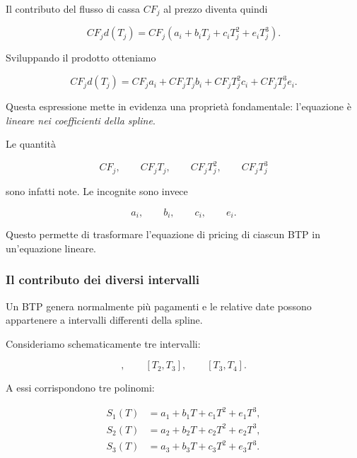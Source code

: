 Il contributo del flusso di cassa $CF_j$ al prezzo diventa quindi

\begin{equation*}
    CF_jd(T_j)
    =
    CF_j
    \left(
    a_i+b_iT_j+c_iT_j^2+e_iT_j^3
    \right).
\end{equation*}

Sviluppando il prodotto otteniamo

\begin{equation*}
    CF_jd(T_j)
    =
    CF_ja_i
    +
    CF_jT_jb_i
    +
    CF_jT_j^2c_i
    +
    CF_jT_j^3e_i.
    \label{eq:cf-spline-linear}
\end{equation*}

Questa espressione mette in evidenza una proprietà fondamentale:
l'equazione è \emph{lineare nei coefficienti della spline}.

Le quantità

\begin{equation*}
    CF_j,\qquad
    CF_jT_j,\qquad
    CF_jT_j^2,\qquad
    CF_jT_j^3
\end{equation*}

sono infatti note. Le incognite sono invece

\begin{equation*}
    a_i,\qquad b_i,\qquad c_i,\qquad e_i.
\end{equation*}

Questo permette di trasformare l'equazione di pricing di ciascun
BTP in un'equazione lineare.


\subsubsection{Il contributo dei diversi intervalli}

Un BTP genera normalmente più pagamenti e le relative date possono
appartenere a intervalli differenti della spline.

Consideriamo schematicamente tre intervalli:

\begin{equation*}
[T_1,T_2],
\qquad
[T_2,T_3],
\qquad
[T_3,T_4].
\end{equation*}

A essi corrispondono tre polinomi:

\begin{align}
S_1(T)&=a_1+b_1T+c_1T^2+e_1T^3,\\
S_2(T)&=a_2+b_2T+c_2T^2+e_2T^3,\\
S_3(T)&=a_3+b_3T+c_3T^2+e_3T^3.
\end{align}

